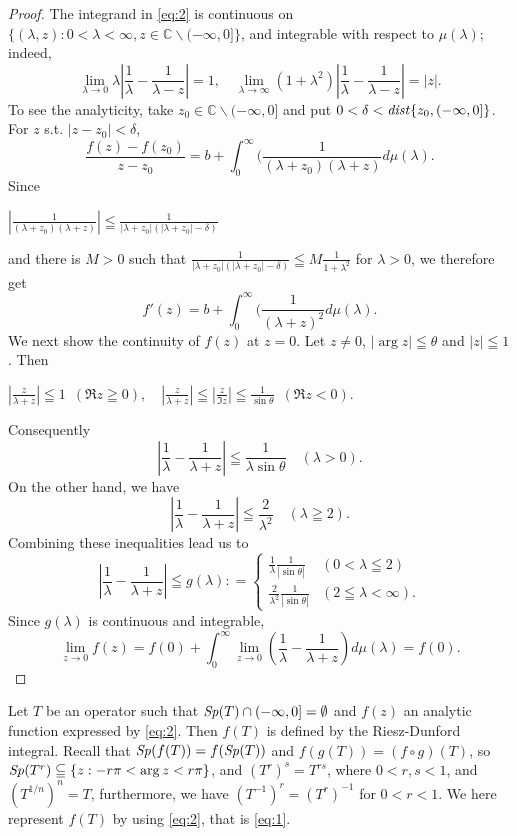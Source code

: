 \documentclass[reqno]{amsart}
\theoremstyle{definition}
\theoremstyle{remark}
\begin{document}
\begin{proof} The integrand in \eqref{eq:2} is continuous on  $\{(\lambda , z ): 0<\lambda <\infty, 
z\in \mathbb{C} \smallsetminus (-\infty, 0] \}$, 
 and integrable with respect to $\mu(\lambda)$; indeed, 
$$\lim_{\lambda \to 0} \lambda |\frac{1}{\lambda} - \frac{1}{\lambda -z}| =1, \quad 
\lim_{\lambda \to \infty} ( 1+ \lambda ^2) |\frac{1}{\lambda} 
- \frac{1}{\lambda -z}| =|z|.$$
To see the analyticity, take $z_0 \in \mathbb{C} \smallsetminus (-\infty, 0] $ and put
$0<\delta < {\it dist}\{ z_0, (-\infty, 0]\}$. For $z$ s.t. $|z - z_0|<\delta$, 
$$\frac{f(z) - f(z_0)}{z- z_0} = b + \int_0^{\infty} (\frac{1}{(\lambda + z_0) (\lambda + z)} d\mu(\lambda).$$
Since 
\begin{center} 
$|\frac{1}{(\lambda + z_0) (\lambda + z)}| \leqq \frac{1}{|\lambda + z_0| (|\lambda + z_0| - \delta )} $
\end{center} 
and there is $M>0$ such that 
$\frac{1}{|\lambda + z_0| (|\lambda + z_0| - \delta )} \leqq M \frac{1}{1 + \lambda ^2}$ for $\lambda >0$,
we therefore get 
$$ f'(z)= b + \int_0^{\infty} (\frac{1}{ (\lambda + z)^2} d\mu(\lambda).$$
 We next show the continuity of $f(z)$ at $z=0$.
Let $z\ne 0$, $|\arg z| \leqq \theta$ and $|z|\leqq 1$. Then
\begin{center}
$|\frac{z}{\lambda + z}|\leqq 1\, \,\, (\Re{z} \geqq 0), \quad 
|\frac{z}{\lambda + z}|\leqq |\frac{z}{\Im z}|\leqq \frac{1}{\sin \theta}\,\,
 \, (\Re{z} <0)$.
\end{center}
Consequently  
$$|\frac{1}{\lambda} - \frac{1}{\lambda + z} | \leqq \frac{1}{\lambda \sin \theta} \quad (\lambda > 0).$$
On the other hand, we have
$$|\frac{1}{\lambda} - \frac{1}{\lambda + z} | \leqq \frac{2}{\lambda ^2} \quad 
(\lambda \geqq 2).$$ Combining these inequalities lead us to   
$$|\frac{1}{\lambda} - \frac{1}{\lambda + z} | \leqq g(\lambda)
: =
\begin{cases}
\frac{1}{\lambda} \frac{1}{ |\sin \theta|}  &  (0 <\lambda \leqq 2)\\
\frac{2}{\lambda^2} \frac{1}{ |\sin \theta|}  & ( 2\leqq \lambda <\infty).
\end{cases}
$$
Since $g(\lambda)$ is continuous and integrable,
$$\lim_{z\to 0} f(z) = f(0) + \int_0^{\infty} \lim_{z\to 0} (\frac{1}{\lambda} - 
\frac{1}{\lambda + z})
 d\mu(\lambda) = f(0).$$
\end{proof}

Let $T$ be an operator such that ${\it Sp}(T) \cap (-\infty, 0] = \emptyset$ and 
$f(z)$ an analytic function expressed by \eqref{eq:2}. Then  
$f(T)$ is defined by the Riesz-Dunford integral. 
Recall that ${\it Sp}(f(T)) = f ({\it Sp}(T))$ and $f(g(T))= (f\circ g)(T)$, so 
${\it Sp}(T^{r}) \subseteqq \{z: -r\pi <\arg z <r \pi\} $,  and  $(T^{r})^s = T^{rs}$,    
where $0<r, s <1$, and  
$ (T^{1/n})^n = T$, furthermore, we have $(T^{-1})^r = (T^r)^{-1}$ for $0<r<1$.  
We here represent $f(T)$ by using \eqref{eq:2}, that is \eqref{eq:1}.  
\end{document}
